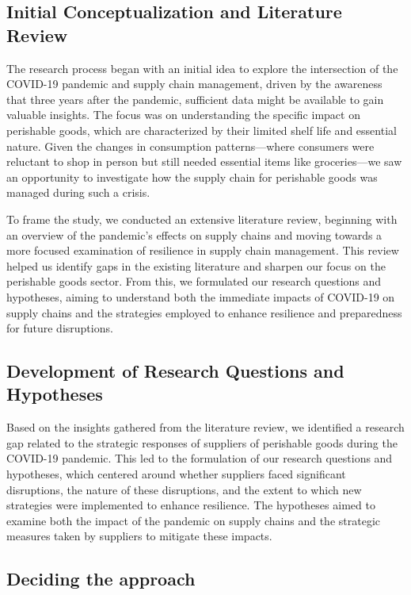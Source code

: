 \subsection{Initial Conceptualization and Literature Review}

The research process began with an initial idea to explore the intersection of the COVID-19 pandemic and supply chain management, driven by the awareness that three years after the pandemic, sufficient data might be available to gain valuable insights. The focus was on understanding the specific impact on perishable goods, which are characterized by their limited shelf life and essential nature. Given the changes in consumption patterns—where consumers were reluctant to shop in person but still needed essential items like groceries—we saw an opportunity to investigate how the supply chain for perishable goods was managed during such a crisis.

To frame the study, we conducted an extensive literature review, beginning with an overview of the pandemic's effects on supply chains and moving towards a more focused examination of resilience in supply chain management. This review helped us identify gaps in the existing literature and sharpen our focus on the perishable goods sector. From this, we formulated our research questions and hypotheses, aiming to understand both the immediate impacts of COVID-19 on supply chains and the strategies employed to enhance resilience and preparedness for future disruptions.

\subsection{Development of Research Questions and Hypotheses}

Based on the insights gathered from the literature review, we identified a research gap related to the strategic responses of suppliers of perishable goods during the COVID-19 pandemic. This led to the formulation of our research questions and hypotheses, which centered around whether suppliers faced significant disruptions, the nature of these disruptions, and the extent to which new strategies were implemented to enhance resilience. The hypotheses aimed to examine both the impact of the pandemic on supply chains and the strategic measures taken by suppliers to mitigate these impacts.

\subsection{Deciding the approach}

